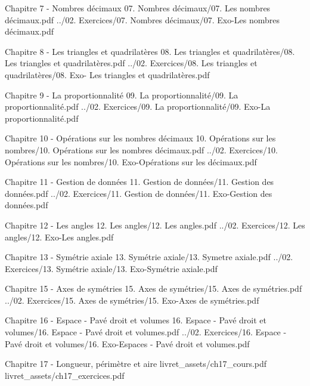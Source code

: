 {Chapitre 7 - Nombres décimaux}
{07. Nombres décimaux/07. Les nombres décimaux.pdf}
{}
{}
{../02. Exercices/07. Nombres décimaux/07. Exo-Les nombres décimaux.pdf}

{Chapitre 8 - Les triangles et quadrilatères}
{08. Les triangles et quadrilatères/08. Les triangles et quadrilatères.pdf}
{}
{}
{../02. Exercices/08. Les triangles et quadrilatères/08. Exo- Les triangles et quadrilatères.pdf}

{Chapitre 9 - La proportionnalité}
{09. La proportionnalité/09. La proportionnalité.pdf}
{}
{}
{../02. Exercices/09. La proportionnalité/09. Exo-La proportionnalité.pdf}

{Chapitre 10 - Opérations sur les nombres décimaux}
{10. Opérations sur les nombres/10. Opérations sur les nombres décimaux.pdf}
{}
{}
{../02. Exercices/10. Opérations sur les nombres/10. Exo-Opérations sur les décimaux.pdf}

{Chapitre 11 - Gestion de données}
{11. Gestion de données/11. Gestion des données.pdf}
{}
{}
{../02. Exercices/11. Gestion de données/11. Exo-Gestion des données.pdf}

{Chapitre 12 - Les angles}
{12. Les angles/12. Les angles.pdf}
{}
{}
{../02. Exercices/12. Les angles/12. Exo-Les angles.pdf}

{Chapitre 13 - Symétrie axiale}
{13. Symétrie axiale/13. Symetre axiale.pdf}
{}
{}
{../02. Exercices/13. Symétrie axiale/13. Exo-Symétrie axiale.pdf}

{Chapitre 15 - Axes de symétries}
{15. Axes de symétries/15. Axes de symétries.pdf}
{}
{}
{../02. Exercices/15. Axes de symétries/15. Exo-Axes de symétries.pdf}

{Chapitre 16 - Espace - Pavé droit et volumes}
{16. Espace - Pavé droit et volumes/16. Espace - Pavé droit et volumes.pdf}
{}
{}
{../02. Exercices/16. Espace - Pavé droit et volumes/16. Exo-Espaces - Pavé droit et volumes.pdf}

{Chapitre 17 - Longueur, périmètre et aire}
{livret_assets/ch17_cours.pdf}
{}
{}
{livret_assets/ch17_exercices.pdf}


